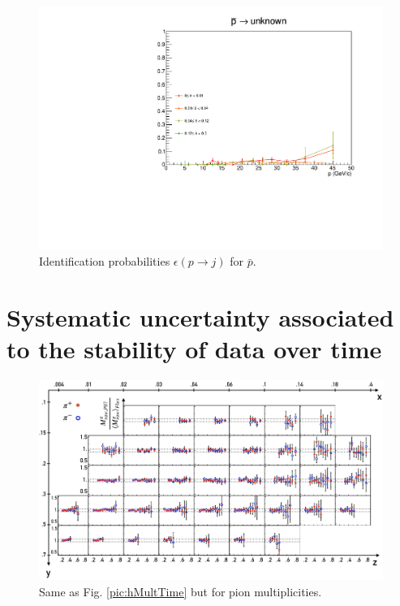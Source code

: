 \begin{figure}[!p]
  \includegraphics[scale=0.38]{./gfx/pm_u.pdf}
	\caption{Identification probabilities $\epsilon(p \rightarrow j)$ for $\bar{p}$.}
	\label{pic:Effpm}
\end{figure}



\section{Systematic uncertainty associated to the stability of data over time}

\begin{figure}
  \centering
	\includegraphics[scale=0.7]{./gfx/SysTimeMultpi.png}
	\caption{Same as Fig. \ref{pic:hMultTime} but for pion multiplicities.}
	\label{pic:piMultTime}
\end{figure}


